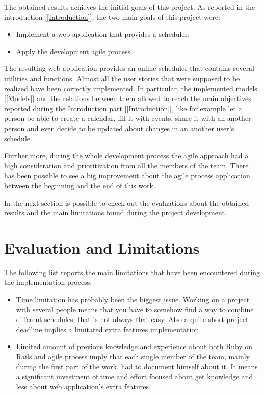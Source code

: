 The obtained results achieves the initial goals of this project.
As reported in the introduction [\ref{Introduction}], the two main goals of this project were:\vspace{-2mm}
\begin{itemize}
 \item Implement a web application that provides a scheduler.
 \item Apply the development agile process.
\end{itemize}

The resulting web application provides an online scheduler that contains several utilities and functions. Almost all the user stories that were supposed to be realized have been correctly implemented. In particular, the implemented models [\ref{Models}] and the relations between them allowed to reach the main objectives reported during the Introduction part [\ref{Introduction}], like for example let a person be able to create a calendar, fill it with events, share it with an another person and even decide to be updated about changes in an another user's schedule.

Further more, during the whole development process the agile approach had a high consideration and prioritization from all the members of the team. There has been possible to see a big improvement about the agile process application between the beginning and the end of this work.

In the next section is possible to check out the evaluations about the obtained results and the main limitations found during the project development.
\newpage

\section{Evaluation and Limitations}
\vspace{-5mm}
\label{Evaluation}
The following list reports the main limitations that have been encountered during the implementation process.
\vspace{-5mm}
\begin{itemize}
\item Time limitation has probably been the biggest issue. Working on a project with several people means that you have to somehow find a way to combine different schedules, that is not always that easy. Also a quite short project deadline implies a limitated extra features implementation.
\item Limited amount of previous knowledge and experience about both Ruby on Rails and agile process imply that each single member of the team, mainly during the first part of the work, had to document himself about it. It means a significant investment of time and effort focused about get knowledge and less about web application's extra features. 
\end{itemize}

